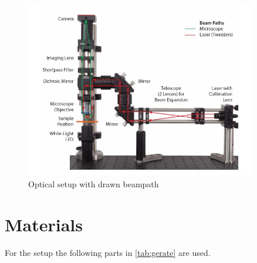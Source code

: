 \documentclass[12pt,english,ngerman]{scrartcl}
\begin{document}
\begin{figure}[H]
	\begin{center}
		\includegraphics[width =0.9\textwidth]{./figures/aufbau_banzer.JPG}
	\end{center}
	\caption[Optical setup] { Optical setup with drawn beampath
	}\label{fig:aufbau_banzer}%
\end{figure}

\section{Materials}\label{sec:geraeteliste}

For the setup the following parts in \autoref{tab:gerate} are used.

\end{document}

